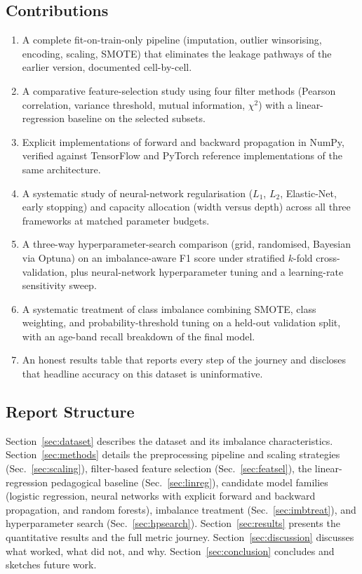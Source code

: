 \documentclass[pdflatex,sn-basic,Numbered]{sn-jnl}
\theoremstyle{thmstyleone}
\theoremstyle{thmstyletwo}
\theoremstyle{thmstylethree}
\begin{document}
\subsection{Contributions}\label{sec:contributions}
\begin{enumerate}
\item A complete fit-on-train-only pipeline (imputation, outlier
winsorising, encoding, scaling, SMOTE) that eliminates the leakage
pathways of the earlier version, documented cell-by-cell.
\item A comparative feature-selection study using four filter methods
(Pearson correlation, variance threshold, mutual information,
$\chi^2$) with a linear-regression baseline on the selected subsets.
\item Explicit implementations of forward and backward propagation in
NumPy, verified against TensorFlow and PyTorch reference
implementations of the same architecture.
\item A systematic study of neural-network regularisation ($L_1$,
$L_2$, Elastic-Net, early stopping) and capacity allocation (width
versus depth) across all three frameworks at matched parameter budgets.
\item A three-way hyperparameter-search comparison (grid, randomised,
Bayesian via Optuna) on an imbalance-aware F1 score under stratified
$k$-fold cross-validation, plus neural-network hyperparameter tuning
and a learning-rate sensitivity sweep.
\item A systematic treatment of class imbalance combining SMOTE, class
weighting, and probability-threshold tuning on a held-out validation
split, with an age-band recall breakdown of the final model.
\item An honest results table that reports every step of the journey and
discloses that headline accuracy on this dataset is uninformative.
\end{enumerate}

\subsection{Report Structure}
Section~\ref{sec:dataset} describes the dataset and its imbalance
characteristics. Section~\ref{sec:methods} details the preprocessing
pipeline and scaling strategies (Sec.~\ref{sec:scaling}), filter-based
feature selection (Sec.~\ref{sec:featsel}), the linear-regression
pedagogical baseline (Sec.~\ref{sec:linreg}), candidate model families
(logistic regression, neural networks with explicit forward and backward
propagation, and random forests), imbalance treatment
(Sec.~\ref{sec:imbtreat}), and hyperparameter search
(Sec.~\ref{sec:hpsearch}). Section~\ref{sec:results} presents the
quantitative results and the full metric journey.
Section~\ref{sec:discussion} discusses what worked, what did not, and
why. Section~\ref{sec:conclusion} concludes and sketches future work.
\end{document}
